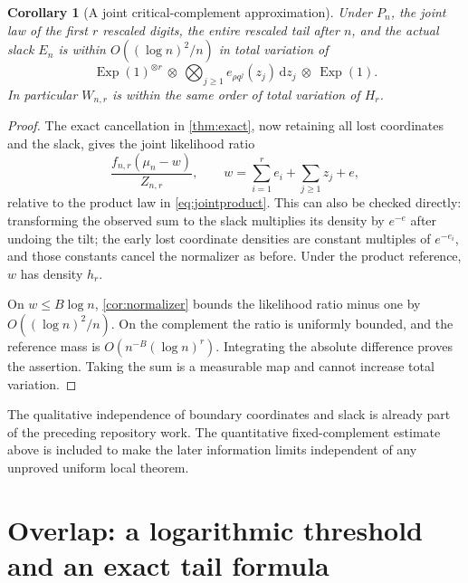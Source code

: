 \documentclass[11pt,oneside]{article}
\numberwithin{equation}{section}
\theoremstyle{plain}
\newtheorem{corollary}[theorem]{Corollary}
\theoremstyle{definition}
\theoremstyle{remark}
\newcommand{\dd}{\,\mathrm d}
\newcommand{\Exp}{\operatorname{Exp}}
\begin{document}
\begin{corollary}[A joint critical-complement approximation]
\label{cor:joint}
Under $P_n$, the joint law of the first $r$ rescaled digits, the
entire rescaled tail after $n$, and the actual slack $E_n$ is within
$O((\log n)^2/n)$ in total variation of
\begin{equation}\label{eq:jointproduct}
 \Exp(1)^{\otimes r}\ \otimes\
 \bigotimes_{j\ge1} e_{\rho q^j}(z_j)\dd z_j\ \otimes\ \Exp(1).
\end{equation}
In particular $W_{n,r}$ is within the same order of total variation
of $H_r$.
\end{corollary}
\begin{proof}
The exact cancellation in \cref{thm:exact}, now retaining all lost
coordinates and the slack, gives the joint likelihood ratio
\[
 \frac{f_{n,r}(\mu_n-w)}{Z_{n,r}},\qquad
 w=\sum_{i=1}^r e_i+\sum_{j\ge1}z_j+e,
\]
relative to the product law in \eqref{eq:jointproduct}. This can also
be checked directly: transforming the observed sum to the slack
multiplies its density by $e^{-e}$ after undoing the tilt; the early
lost coordinate densities are constant multiples of $e^{-e_i}$,
and those constants cancel the normalizer as before. Under the
product reference, $w$ has density $h_r$.

On $w\le B\log n$, \cref{cor:normalizer} bounds the likelihood ratio
minus one by $O((\log n)^2/n)$. On the complement the ratio is
uniformly bounded, and the reference mass is
$O(n^{-B}(\log n)^r)$. Integrating the absolute difference proves
the assertion. Taking the sum is a measurable map and cannot
increase total variation.
\end{proof}

The qualitative independence of boundary coordinates and slack is
already part of the preceding repository work. The quantitative
fixed-complement estimate above is included to make the later
information limits independent of any unproved uniform local theorem.

\section{Overlap: a logarithmic threshold and an exact tail formula}
\label{sec:overlap}
\end{document}
